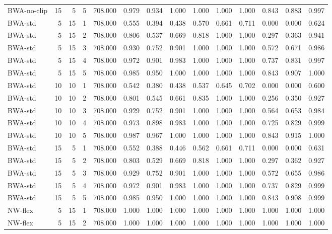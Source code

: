 \begin{table}
\begin{tabular}{lrrrrrrrrrrrrr}
BWA-no-clip & 15 & 5 & 5 & 708.000 & 0.979 & 0.934 & 1.000 & 1.000 & 1.000 & 1.000 & 0.843 & 0.883 & 0.997 \\
BWA-std & 5 & 15 & 1 & 708.000 & 0.555 & 0.394 & 0.438 & 0.570 & 0.661 & 0.711 & 0.000 & 0.000 & 0.624 \\
BWA-std & 5 & 15 & 2 & 708.000 & 0.806 & 0.537 & 0.669 & 0.818 & 1.000 & 1.000 & 0.297 & 0.363 & 0.941 \\
BWA-std & 5 & 15 & 3 & 708.000 & 0.930 & 0.752 & 0.901 & 1.000 & 1.000 & 1.000 & 0.572 & 0.671 & 0.986 \\
BWA-std & 5 & 15 & 4 & 708.000 & 0.972 & 0.901 & 0.983 & 1.000 & 1.000 & 1.000 & 0.737 & 0.831 & 0.997 \\
BWA-std & 5 & 15 & 5 & 708.000 & 0.985 & 0.950 & 1.000 & 1.000 & 1.000 & 1.000 & 0.843 & 0.907 & 1.000 \\
BWA-std & 10 & 10 & 1 & 708.000 & 0.542 & 0.380 & 0.438 & 0.537 & 0.645 & 0.702 & 0.000 & 0.000 & 0.600 \\
BWA-std & 10 & 10 & 2 & 708.000 & 0.801 & 0.545 & 0.661 & 0.835 & 1.000 & 1.000 & 0.256 & 0.350 & 0.927 \\
BWA-std & 10 & 10 & 3 & 708.000 & 0.929 & 0.752 & 0.901 & 1.000 & 1.000 & 1.000 & 0.564 & 0.653 & 0.984 \\
BWA-std & 10 & 10 & 4 & 708.000 & 0.973 & 0.898 & 0.983 & 1.000 & 1.000 & 1.000 & 0.725 & 0.829 & 0.999 \\
BWA-std & 10 & 10 & 5 & 708.000 & 0.987 & 0.967 & 1.000 & 1.000 & 1.000 & 1.000 & 0.843 & 0.915 & 1.000 \\
BWA-std & 15 & 5 & 1 & 708.000 & 0.552 & 0.388 & 0.446 & 0.562 & 0.661 & 0.711 & 0.000 & 0.000 & 0.631 \\
BWA-std & 15 & 5 & 2 & 708.000 & 0.803 & 0.529 & 0.669 & 0.818 & 1.000 & 1.000 & 0.297 & 0.362 & 0.927 \\
BWA-std & 15 & 5 & 3 & 708.000 & 0.929 & 0.752 & 0.901 & 1.000 & 1.000 & 1.000 & 0.572 & 0.655 & 0.986 \\
BWA-std & 15 & 5 & 4 & 708.000 & 0.972 & 0.901 & 0.983 & 1.000 & 1.000 & 1.000 & 0.737 & 0.829 & 0.999 \\
BWA-std & 15 & 5 & 5 & 708.000 & 0.985 & 0.950 & 1.000 & 1.000 & 1.000 & 1.000 & 0.843 & 0.908 & 0.999 \\
NW-flex & 5 & 15 & 1 & 708.000 & 1.000 & 1.000 & 1.000 & 1.000 & 1.000 & 1.000 & 1.000 & 1.000 & 1.000 \\
NW-flex & 5 & 15 & 2 & 708.000 & 1.000 & 1.000 & 1.000 & 1.000 & 1.000 & 1.000 & 1.000 & 1.000 & 1.000 \\

\end{tabular}
\end{table}

